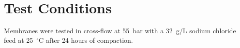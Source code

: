 \chapter{Test Conditions}
\label{app:a}

Membranes were tested in cross-flow at 55~bar with a 32~g/L sodium chloride feed at 25~$^\circ$C
after 24 hours of compaction.

